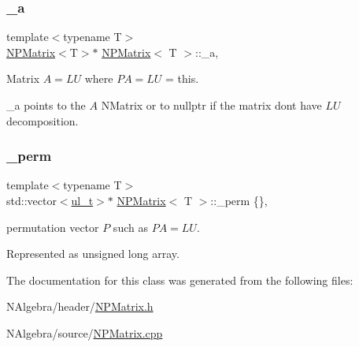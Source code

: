 \subsubsection{\texorpdfstring{\_a}{\_a}}
{\footnotesize\ttfamily template$<$typename T$>$ \\
\mbox{\hyperlink{class_n_p_matrix}{N\+P\+Matrix}}$<$T$>$$\ast$ \mbox{\hyperlink{class_n_p_matrix}{N\+P\+Matrix}}$<$ T $>$\+::\+\_\+a\hspace{0.3cm}{\ttfamily [mutable]}, {\ttfamily [protected]}}



Matrix $ A = LU $ where $ PA = LU $ = this. 

{\ttfamily \+\_\+a} points to the $ A $ N\+Matrix or to {\ttfamily nullptr} if the matrix don\textquotesingle{}t have $ LU $ decomposition. \mbox{\label{class_n_p_matrix_adae969b094e97895a62412765b50fb6f}} 
\subsubsection{\texorpdfstring{\_perm}{\_perm}}
{\footnotesize\ttfamily template$<$typename T$>$ \\
std\+::vector$<$\mbox{\hyperlink{typedef_8h_a1b140a2034db3f5dfe18a987745df43a}{ul\+\_\+t}}$>$$\ast$ \mbox{\hyperlink{class_n_p_matrix}{N\+P\+Matrix}}$<$ T $>$\+::\+\_\+perm \{\}\hspace{0.3cm}{\ttfamily [mutable]}, {\ttfamily [protected]}}



permutation vector $ P $ such as $ PA = LU $. 

Represented as {\ttfamily unsigned long} array. 

The documentation for this class was generated from the following files\+:\begin{DoxyCompactItemize}
\item 
N\+Algebra/header/\mbox{\hyperlink{_n_p_matrix_8h}{N\+P\+Matrix.\+h}}\item 
N\+Algebra/source/\mbox{\hyperlink{_n_p_matrix_8cpp}{N\+P\+Matrix.\+cpp}}\end{DoxyCompactItemize}
